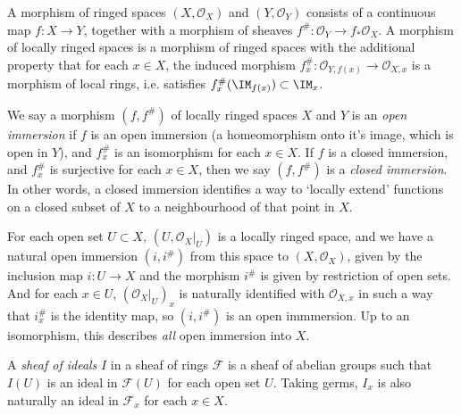 A morphism of ringed spaces $(X,\mathcal{O}_X)$ and $(Y,\mathcal{O}_Y)$ consists of a continuous map $f: X \to Y$, together with a morphism of sheaves $f^\#: \mathcal{O}_Y \to f_* \mathcal{O}_X$. A morphism of locally ringed spaces is a morphism of ringed spaces with the additional property that for each $x \in X$, the induced morphism $f^\#_x: \mathcal{O}_{Y,f(x)} \to \mathcal{O}_{X,x}$ is a morphism of local rings, i.e. satisfies $f^\#_x(\IM_{f(x)}) \subset \IM_x$.

We say a morphism $(f,f^\#)$ of locally ringed spaces $X$ and $Y$ is an \emph{open immersion} if $f$ is an open immersion (a homeomorphism onto it's image, which is open in $Y$), and $f_x^\#$ is an isomorphism for each $x \in X$. If $f$ is a closed immersion, and $f_x^\#$ is surjective for each $x \in X$, then we say $(f,f^\#)$ is a \emph{closed immersion}. In other words, a closed immersion identifies a way to `locally extend' functions on a closed subset of $X$ to a neighbourhood of that point in $X$.

\begin{example}
    For each open set $U \subset X$, $(U,\mathcal{O}_X|_U)$ is a locally ringed space, and we have a natural open immersion $(i,i^\#)$ from this space to $(X,\mathcal{O}_X)$, given by the inclusion map $i: U \to X$ and the morphism $i^\#$ is given by restriction of open sets. And for each $x \in U$, $(\mathcal{O}_X|_U)_x$ is naturally identified with $\mathcal{O}_{X,x}$ in such a way that $i^\#_x$ is the identity map, so $(i,i^\#)$ is an open immmersion. Up to an isomorphism, this describes \emph{all} open immersion into $X$.
\end{example}

A \emph{sheaf of ideals} $I$ in a sheaf of rings $\mathcal{F}$ is a sheaf of abelian groups such that $I(U)$ is an ideal in $\mathcal{F}(U)$ for each open set $U$. Taking germs, $I_x$ is also naturally an ideal in $\mathcal{F}_x$ for each $x \in X$.

